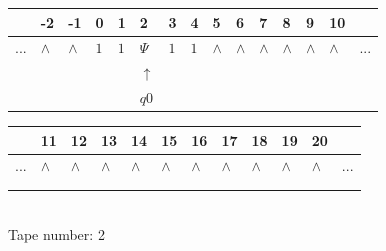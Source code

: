 \documentclass[11pt]{article}
\begin{document}
\begin{table}[H]
\centering
\begin{tabular}{lllllllllllllll}
 & -2 & -1 & 0 & 1 & 2 & 3 & 4 & 5 & 6 & 7 & 8 & 9 & 10 & \\
\hline
$...$ & \multicolumn{1}{|l|}{$\wedge$} & \multicolumn{1}{|l|}{$\wedge$} & \multicolumn{1}{|l|}{$1$} & \multicolumn{1}{|l|}{$1$} & \multicolumn{1}{|l|}{$\Psi$} & \multicolumn{1}{|l|}{$1$} & \multicolumn{1}{|l|}{$1$} & \multicolumn{1}{|l|}{$\wedge$} & \multicolumn{1}{|l|}{$\wedge$} & \multicolumn{1}{|l|}{$\wedge$} & \multicolumn{1}{|l|}{$\wedge$} & \multicolumn{1}{|l|}{$\wedge$} & \multicolumn{1}{|l|}{$\wedge$} & $...$\\
\hline
&  &  &  &  & $\uparrow$ &  &  &  &  &  &  &  &  &  \\
&  &  &  &  & $ q0 $ &  &  &  &  &  &  &  &  &  \\
\end{tabular}
\begin{tabular}{llllllllllll}
 & 11 & 12 & 13 & 14 & 15 & 16 & 17 & 18 & 19 & 20 & \\
\hline
$...$ & \multicolumn{1}{|l|}{$\wedge$} & \multicolumn{1}{|l|}{$\wedge$} & \multicolumn{1}{|l|}{$\wedge$} & \multicolumn{1}{|l|}{$\wedge$} & \multicolumn{1}{|l|}{$\wedge$} & \multicolumn{1}{|l|}{$\wedge$} & \multicolumn{1}{|l|}{$\wedge$} & \multicolumn{1}{|l|}{$\wedge$} & \multicolumn{1}{|l|}{$\wedge$} & \multicolumn{1}{|l|}{$\wedge$} & $...$\\
\hline
&  &  &  &  &  &  &  &  &  &  &  \\
&  &  &  &  &  &  &  &  &  &  &  \\
\end{tabular}
\\
Tape number: 2
\noindent\makebox[\linewidth]{\hdashrule{\textwidth}{1pt}{1pt}}\end{table}
\end{document}
